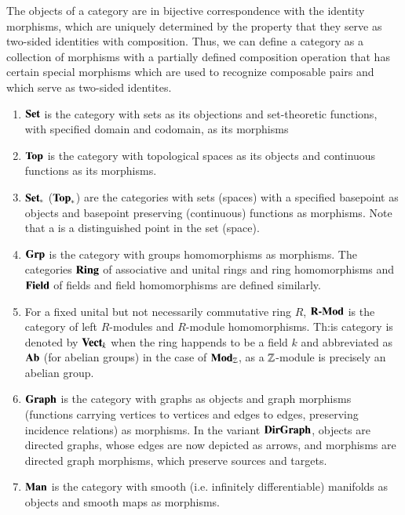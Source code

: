 \begin{remark}
    The objects of a category are in bijective correspondence with the identity morphisms, which are uniquely determined by the property that they serve as two-sided identities with composition. Thus, we can define a category as a collection of morphisms with a partially defined composition operation that has certain special morphisms which are used to recognize composable pairs and which serve as two-sided identites. 
\end{remark}


\begin{example}
    \leavevmode
    \begin{enumerate}
        \item $\normalfont\textbf{Set}$ is the category with sets as its objections and set-theoretic functions, with specified domain and codomain, as its morphisms
        \item $\normalfont\textbf{Top}$ is the category with topological spaces as its objects and continuous functions as its morphisms.
        \item $\normalfont\textbf{Set}_*$ ($\normalfont\textbf{Top}_*$) are the categories with sets (spaces) with a specified basepoint as objects and basepoint preserving (continuous) functions as morphisms. Note that a  is a distinguished point in the set (space).
        \item $\normalfont\textbf{Grp}$ is the category with groups homomorphisms as morphisms. The categories $\normalfont\textbf{Ring}$ of associative and unital rings and ring homomorphisms and $\normalfont\textbf{Field}$ of fields and field homomorphisms are defined similarly.
        \item For a fixed unital but not necessarily commutative ring $R$, $\normalfont\textbf{R-Mod}$ is the category of left $R$-modules and $R$-module homomorphisms. Th:is category is denoted by $\normalfont\textbf{Vect}_{k}$ when the ring happends to be a field $k$ and abbreviated as $\normalfont\textbf{Ab}$ (for abelian groups) in the case of $\normalfont\textbf{Mod}_{\mathbb Z}$, as a $\mathbb Z$-module is precisely an abelian group.
        \item $\normalfont\textbf{Graph}$ is the category with graphs as objects and graph morphisms (functions carrying vertices to vertices and edges to edges, preserving incidence relations) as morphisms. In the variant $\normalfont\textbf{DirGraph}$, objects are directed graphs, whose edges are now depicted as arrows, and morphisms are directed graph morphisms, which preserve sources and targets.
        \item $\normalfont\textbf{Man}$ is the category with smooth (i.e. infinitely differentiable) manifolds as objects and smooth maps as morphisms.

\end{enumerate}
\end{example}

